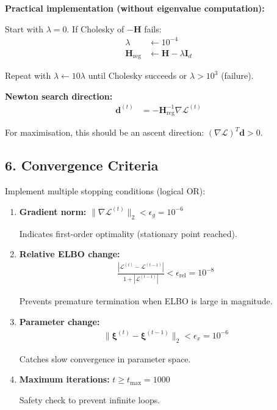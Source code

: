 \documentclass[11pt,a4paper]{article}
\begin{document}
\textbf{Practical implementation (without eigenvalue computation):}

Start with $\lambda = 0$. If Cholesky of $-\bm{H}$ fails:
\begin{align}
\lambda &\leftarrow 10^{-4}\\
\bm{H}_{\text{reg}} &\leftarrow \bm{H} - \lambda \bm{I}_d
\end{align}

Repeat with $\lambda \leftarrow 10 \lambda$ until Cholesky succeeds or $\lambda > 10^{3}$ (failure).

\textbf{Newton search direction:}
\begin{align}
\bm{d}^{(t)} &= -\bm{H}_{\text{reg}}^{-1} \nabla \mathcal{L}^{(t)}
\end{align}

For maximisation, this should be an ascent direction: $(\nabla \mathcal{L})^T \bm{d} > 0$.

\subsection*{6. Convergence Criteria}

Implement multiple stopping conditions (logical OR):

\begin{enumerate}
\item \textbf{Gradient norm:} $\|\nabla \mathcal{L}^{(t)}\|_2 < \epsilon_g = 10^{-6}$

Indicates first-order optimality (stationary point reached).

\item \textbf{Relative ELBO change:}
\begin{align}
\frac{|\mathcal{L}^{(t)} - \mathcal{L}^{(t-1)}|}{1 + |\mathcal{L}^{(t-1)}|} < \epsilon_{\text{rel}} = 10^{-8}
\end{align}

Prevents premature termination when ELBO is large in magnitude.

\item \textbf{Parameter change:}
\begin{align}
\|\bm{\xi}^{(t)} - \bm{\xi}^{(t-1)}\|_2 < \epsilon_x = 10^{-6}
\end{align}

Catches slow convergence in parameter space.

\item \textbf{Maximum iterations:} $t \geq t_{\max} = 1000$

Safety check to prevent infinite loops.
\end{enumerate}
\end{document}
